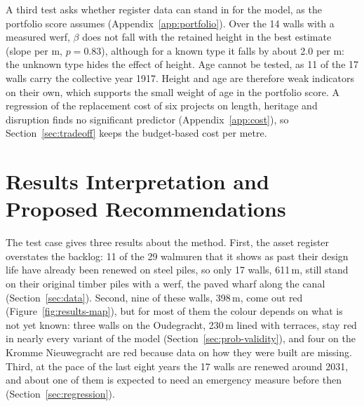 A third test asks whether register data can stand in for the model, as the
portfolio score assumes (Appendix~\ref{app:portfolio}). Over the 14 walls with a
measured werf, $\beta$ does not fall with the retained height in the best
estimate (slope  per m, $p = 0.83$), although for a known type it
falls by about 2.0 per m: the unknown type hides the effect of height. Age
cannot be tested, as 11 of the 17 walls carry the collective year 1917. Height
and age are therefore weak indicators on their own, which supports the small
weight of age in the portfolio score. A regression of the replacement cost of six projects on length, heritage and
disruption finds no significant predictor (Appendix~\ref{app:cost}), so
Section~\ref{sec:tradeoff} keeps the budget-based cost per metre.

\clearpage
\section{Results Interpretation and Proposed Recommendations}
\label{sec:results-recommendations}


The test case gives three results about the method. First, the asset register
overstates the backlog: 11 of the 29 walmuren that it shows as past their
design life have already been renewed on steel piles, so only 17 walls, 611\,m,
still stand on their original timber piles with a werf, the paved wharf along
the canal (Section~\ref{sec:data}). Second, nine of these walls, 398\,m, come
out red (Figure~\ref{fig:results-map}), but for most of them the colour depends
on what is not yet known: three walls on the Oudegracht, 230\,m lined with
terraces, stay red in nearly every variant of the model
(Section~\ref{sec:prob-validity}), and four on the Kromme Nieuwegracht are red
because data on how they were built are missing. Third, at the pace of the last
eight years the 17 walls are renewed around 2031, and about one of them is
expected to need an emergency measure before then
(Section~\ref{sec:regression}).

